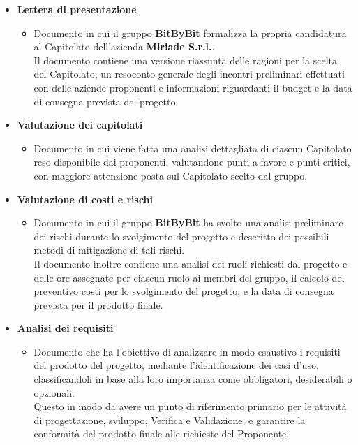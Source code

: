 \documentclass[a4paper,12pt]{article}
\begin{document}
\begin{itemize}
    \item \textbf{Lettera di presentazione}
    \begin{itemize}
        \item Documento in cui il gruppo \textbf{BitByBit} formalizza la propria candidatura al Capitolato dell’azienda \textbf{Miriade S.r.l.}.
        \\Il documento contiene una versione riassunta delle ragioni per la scelta del Capitolato, un resoconto generale degli incontri preliminari effettuati con delle aziende proponenti e informazioni riguardanti il budget e la data di consegna prevista del progetto.
    \end{itemize}
    
    \item \textbf{Valutazione dei capitolati}
    \begin{itemize}
        \item Documento in cui viene fatta una analisi dettagliata di ciascun Capitolato reso disponibile dai proponenti, valutandone punti a favore e punti critici, con maggiore attenzione posta sul Capitolato scelto dal gruppo.
    \end{itemize}

    \item \textbf{Valutazione di costi e rischi}
    \begin{itemize}
        \item Documento in cui il gruppo \textbf{BitByBit} ha svolto una analisi preliminare dei rischi durante lo svolgimento del progetto e descritto dei possibili metodi di mitigazione di tali rischi.
        \\Il documento inoltre contiene una analisi dei ruoli richiesti dal progetto e delle ore assegnate per ciascun ruolo ai membri del gruppo, il calcolo del preventivo costi per lo svolgimento del progetto, e la data di consegna prevista per il prodotto finale.

    \end{itemize}

    \item \textbf{Analisi dei requisiti}
    \begin{itemize}
        \item Documento che ha l’obiettivo di analizzare in modo esaustivo i requisiti del prodotto del progetto, mediante l’identificazione dei casi d’uso, classificandoli in base alla loro importanza come obbligatori, desiderabili o opzionali. 
        \\Questo in modo da avere un punto di riferimento primario per le attività di progettazione, sviluppo, Verifica e Validazione, e garantire la conformità del prodotto finale alle richieste del Proponente.
    \end{itemize}


\end{itemize}
\end{document}
